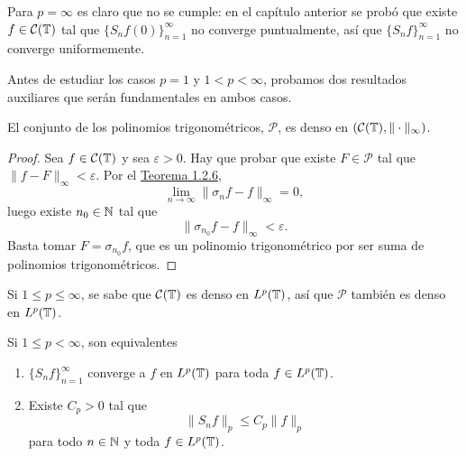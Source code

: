 \documentclass[a4paper, 12pt]{book}
\begin{document}
Para $p = \infty$ es claro que no se cumple: en el capítulo anterior se probó que existe $f\in\mathcal{C}(\mathbb T)$ tal que $\{S_nf(0)\}_{n=1}^\infty$ no converge puntualmente, así que $\{S_nf\}_{n=1}^\infty$ no converge uniformemente.

Antes de estudiar los casos $p=1$ y $1<p<\infty$, probamos dos resultados auxiliares que serán fundamentales en ambos casos.

\begin{lemma}
    El conjunto de los polinomios trigonométricos, $\mathcal{P}$, es denso en $(\mathcal{C}(\mathbb T),\|\cdot\|_\infty)$.
\end{lemma}

\begin{proof}
    Sea $f \in \mathcal{C}(\mathbb T)$ y sea $\varepsilon > 0$. Hay que probar que existe $F \in \mathcal{P}$ tal que $\|f-F\|_\infty < \varepsilon$. Por el \hyperref[1.2.6]{Teorema 1.2.6},
    \[\lim_{n \to \infty} \|\sigma_nf-f\|_\infty = 0,\]
    luego existe $n_0 \in \mathbb N$ tal que
    \[\|\sigma_{n_0}f-f\|_\infty < \varepsilon.\]
    Basta tomar $F = \sigma_{n_0}f$, que es un polinomio trigonométrico por ser suma de polinomios trigonométricos.
\end{proof}

Si $1 \leq p \leq \infty$, se sabe que $\mathcal{C}(\mathbb T)$ es denso en $L^p(\mathbb T)$, así que $\mathcal{P}$ también es denso en $L^p(\mathbb T)$.

\begin{lemma}\label{3.0.2}
    Si $1 \leq p < \infty$, son equivalentes
    \begin{enumerate}
        \item $\{S_nf\}_{n=1}^\infty$ converge a $f$ en $L^p(\mathbb T)$ para toda $f \in L^p(\mathbb T)$.
        \item Existe $C_p > 0$ tal que
        \[\|S_nf\|_{p} \leq C_p \|f\|_{p}\]
        para todo $n \in \mathbb N$ y toda $f \in L^p(\mathbb T)$.
    \end{enumerate}
\end{lemma}
\end{document}

